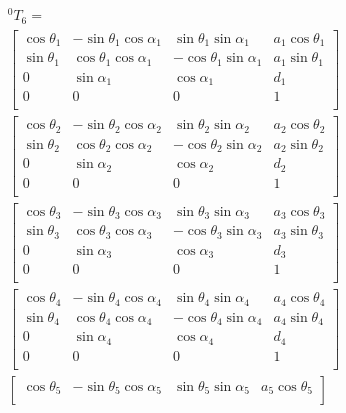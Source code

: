 \begin{multline}\label{eq:TransformMatrices_0-6}
	^0T_6=\\
	\begin{bmatrix}
\cos\theta_1 & -\sin\theta_1  \cos\alpha_1 & \sin\theta_1  \sin\alpha_1 & a_1  \cos\theta_1 \\
\sin\theta_1 & \cos\theta_1  \cos\alpha_1 & -\cos\theta_1  \sin\alpha_1 & a_1  \sin\theta_1 \\
0 & \sin\alpha_1 & \cos\alpha_1 & d_1 \\
0 & 0 & 0 & 1 \\
\end{bmatrix}
  \\
\begin{bmatrix}
\cos\theta_2 & -\sin\theta_2  \cos\alpha_2 & \sin\theta_2  \sin\alpha_2 & a_2  \cos\theta_2 \\
\sin\theta_2 & \cos\theta_2  \cos\alpha_2 & -\cos\theta_2  \sin\alpha_2 & a_2  \sin\theta_2 \\
0 & \sin\alpha_2 & \cos\alpha_2 & d_2 \\
0 & 0 & 0 & 1 \\
\end{bmatrix}
  \\
\begin{bmatrix}
\cos\theta_3 & -\sin\theta_3  \cos\alpha_3 & \sin\theta_3  \sin\alpha_3 & a_3  \cos\theta_3 \\
\sin\theta_3 & \cos\theta_3  \cos\alpha_3 & -\cos\theta_3  \sin\alpha_3 & a_3  \sin\theta_3 \\
0 & \sin\alpha_3 & \cos\alpha_3 & d_3 \\
0 & 0 & 0 & 1 \\
\end{bmatrix}
  \\
\begin{bmatrix}
\cos\theta_4 & -\sin\theta_4  \cos\alpha_4 & \sin\theta_4  \sin\alpha_4 & a_4  \cos\theta_4 \\
\sin\theta_4 & \cos\theta_4  \cos\alpha_4 & -\cos\theta_4  \sin\alpha_4 & a_4  \sin\theta_4 \\
0 & \sin\alpha_4 & \cos\alpha_4 & d_4 \\
0 & 0 & 0 & 1 \\
\end{bmatrix}
  \\
\begin{bmatrix}
\cos\theta_5 & -\sin\theta_5  \cos\alpha_5 & \sin\theta_5  \sin\alpha_5 & a_5  \cos\theta_5 \\

\end{bmatrix}
\end{multline}
